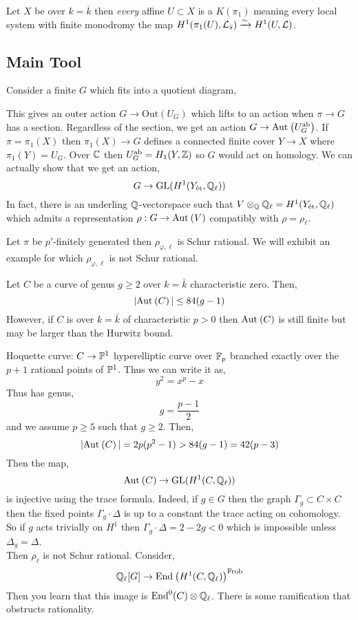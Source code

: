 \documentclass[12pt]{article}
\begin{document}
\begin{theorem}[Achinger]
Let $X$ be over $k = \overline{k}$ then \textit{every} affine $U \subset X$ is a $K(\pi_1)$ meaning every local system with finite monodromy the map $H^1(\pi_1(U), \L_{\bar{s}}) \iso H^1(U, \L)$. 
\end{theorem}

\subsection{Main Tool}

Consider a finite $G$ which fits into a quotient diagram,
\begin{center}
\end{center}
This gives an outer action $G \to \mathrm{Out}(U_G)$ which lifts to an action when $\pi \to G$ has a section. Regardless of the section, we get an action $G \to \Aut{U_G^\ab}$. If $\pi = \pi_1(X)$ then $\pi_1(X) \to G$ defines a connected finite \etale cover $Y \to X$ where $\pi_1(Y) = U_G$. Over $\CC$ then $U_G^\ab = H_1(Y, \ZZ)$ so $G$ would act on homology. We can actually show that we get an action,
\[ G \to \GL(H^1(Y_\et, \Q_\ell)) \]
In fact, there is an underling $\Q$-vectorspace such that $V \ot_{\Q} \Q_{\ell} = H^1(Y_{\et}, \Q_\ell)$ which admits a representation $\rho : G \to \Aut{V}$ compatibly with $\rho = \rho_\ell$. 

\begin{rmk}
Let $\pi$ be $p'$-finitely generated then $\rho_{\varphi, \ell}$ is Schur rational. We will exhibit an example for which $\rho_{\varphi, \ell}$ is not Schur rational.  
\end{rmk}

Let $C$ be a curve of genus $g \ge 2$ over $k = \bar{k}$ characteristic zero. Then,
\[ |\Aut{C}| \le 84(g - 1) \]
However, if $C$ is over $k = \bar{k}$ of characteristic $p > 0$ then $\Aut{C}$ is still finite but may be larger than the Hurwitz bound.

\begin{example}
Hoquette curve: $C \to \P^1$ hyperelliptic curve over $\FF_p$ branched exactly over the $p+1$ rational points of $\P^1$. Thus we can write it as,
\[ y^2 = x^p - x \]
Thus has genus,
\[ g = \frac{p-1}{2} \]
and we assume $p \ge 5$ such that $g \ge 2$. Then,
\[ |\Aut{C}| = 2p(p^2 - 1) > 84 (g - 1) = 42 (p - 3) \]
Then the map,
\[ \Aut{C} \to \GL(H^1(C, \Q_\ell)) \]
is injective using the trace formula. Indeed, if $g \in G$ then the graph $\Gamma_g \subset C \times C$ then the fixed points $\Gamma_g \cdot \Delta$ is up to a constant the trace acting on cohomology. So if $g$ acts trivially on $H^1$ then $\Gamma_g \cdot \Delta = 2 - 2 g < 0$ which is impossible unless $\Delta_g = \Delta$. 
\bigskip\\
Then $\rho_{\ell}$ is not Schur rational. Consider,
\[ \Q_{\ell}[G] \to \End{H^1(C, \Q_\ell)}^{\Frob} \]
Then you learn that this image is $\mathrm{End}^0(C) \ot \Q_{\ell}$. There is some ramification that obstructs rationality. 
\end{example}
\end{document}
